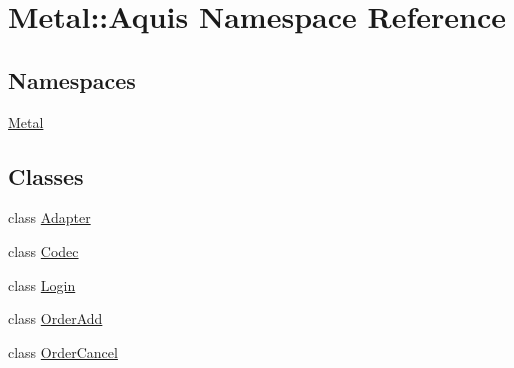 \hypertarget{namespaceMetal_1_1Aquis}{}\section{Metal\+:\+:Aquis Namespace Reference}
\label{namespaceMetal_1_1Aquis}
\subsection*{Namespaces}
\begin{DoxyCompactItemize}
\item 
 \hyperlink{namespaceMetal_1_1Aquis_1_1Metal}{Metal}
\end{DoxyCompactItemize}
\subsection*{Classes}
\begin{DoxyCompactItemize}
\item 
class \hyperlink{classMetal_1_1Aquis_1_1Adapter}{Adapter}
\item 
class \hyperlink{classMetal_1_1Aquis_1_1Codec}{Codec}
\item 
class \hyperlink{classMetal_1_1Aquis_1_1Login}{Login}
\item 
class \hyperlink{classMetal_1_1Aquis_1_1OrderAdd}{Order\+Add}
\item 
class \hyperlink{classMetal_1_1Aquis_1_1OrderCancel}{Order\+Cancel}
\end{DoxyCompactItemize}
